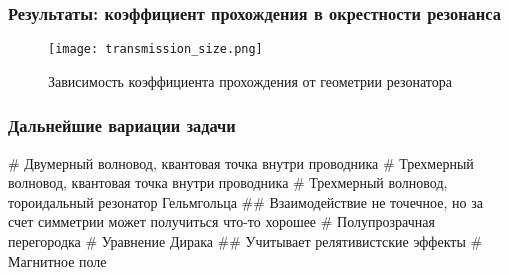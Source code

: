 \documentclass{beamer}
\begin{document}
\begin{frame}[fragile]
\frametitle{Результаты: коэффициент прохождения в окрестности резонанса}
\begin{figure}
\texttt{[image: transmission\_size.png]}
\caption{Зависимость коэффициента прохождения от геометрии резонатора}
\end{figure}
\end{frame}




\begin{frame}[fragile]
\frametitle{Дальнейшие вариации задачи}
\begin{easylist}[itemize]
# Двумерный волновод, квантовая точка внутри проводника
# Трехмерный волновод, квантовая точка внутри проводника
# Трехмерный волновод, тороидальный резонатор Гельмгольца
## Взаимодействие не точечное, но за счет симметрии может получиться что-то хорошее
# Полупрозрачная перегородка 
# Уравнение Дирака
## Учитывает релятивистские эффекты
# Магнитное поле
\end{easylist}
\end{frame}
\end{document}
